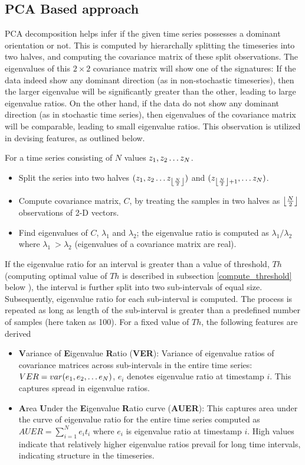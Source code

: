 \documentclass[journal]{IEEEtran}
\DeclarePairedDelimiter\floor{\lfloor}{\rfloor}
\begin{document}
	\subsection{PCA Based approach}
	
	PCA  decomposition helps infer if the given time series possesses a dominant orientation or not. This is computed by hierarchally splitting the timeseries into two halves, and computing the covariance matrix of these split observations. The eigenvalues of this $2 \times 2$ covariance matrix will show one of the signatures: If the data indeed show any dominant direction (as in non-stochastic timeseries), then the larger eigenvalue will be significantly greater than the other, leading to large eigenvalue ratios. On the other hand, if the data do not show any dominant direction (as in stochastic time series), then eigenvalues of the covariance matrix will be comparable, leading to small eigenvalue ratios. This observation is utilized in devising features, as outlined below.
	
	For a time series consisting of $N$ values  $z_1, z_2 \mathellipsis z_N$.
	\begin{itemize}
		\item  Split the series into two halves $(z_1, z_2 \mathellipsis z_{\floor*{\frac{N}{2}}})$ and $(z_{\floor*{\frac{N}{2}} + 1}, \mathellipsis z_N)$.
		\item Compute covariance matrix, $C$,  by treating the samples in two halves as $\floor*{\frac{N}{2}}$ observations of 2-D vectors.
		\item Find eigenvalues of $C$, $\lambda_1$ and $\lambda_2$; the eigenvalue ratio is computed as  $\lambda_1/\lambda_2$ where $\lambda_1 \ > \lambda_2$ (eigenvalues of a covariance matrix are real).
	\end{itemize}
	If the eigenvalue ratio for an interval is greater than a value of threshold, $Th$ (computing optimal value of $Th$ is described in subsection \ref{compute_threshold} below ), the interval is further split into two sub-intervals of equal size.  Subsequently, eigenvalue ratio for each sub-interval is computed. The process is repeated as long as length of the sub-interval is greater than a predefined number of samples (here taken as 100).
	For a fixed value of $Th$, the following features are derived
	\begin{itemize}
		\item \textbf{V}ariance of \textbf{E}igenvalue \textbf{R}atio (\textbf{VER}): Variance of eigenvalue ratios of covariance matrices across sub-intervals in the entire time series: $VER=var(e_1,e_2,\mathellipsis e_N)$, $e_i$ denotes  eigenvalue ratio at timestamp  $i$. This captures spread in eigenvalue ratios.
		\item \textbf{A}rea \textbf{U}nder the \textbf{E}igenvalue \textbf{R}atio curve (\textbf{AUER}): This captures area under the curve of eigenvalue ratio for the entire time series computed as $AUER=\sum_{i=1}^{N} e_{i}t_{i}$ where $e_i$ is eigenvalue ratio at timestamp  $i$. High values indicate that relatively higher eigenvalue ratios prevail for long time intervals, indicating structure in the timeseries.
	\end{itemize}
	
\end{document}
